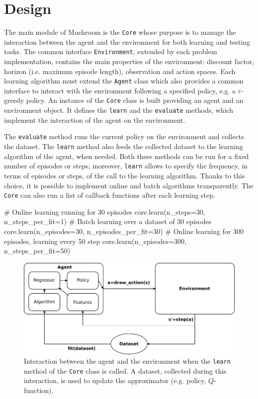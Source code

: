 \section{Design}
The main module of Mushroom is the \texttt{Core} whose purpose is to manage the interaction between the agent and the environment for both learning and testing tasks.
The common interface \texttt{Environment}, extended by each problem implementation, contains the main properties of the environment: discount factor, horizon (i.e. maximum episode length), observation and action spaces.
Each learning algorithm must extend the \texttt{Agent} class which also provides a common interface to interact with the environment following a specified policy, e.g. a $\varepsilon$-greedy policy.
An instance of the \texttt{Core} class is built providing an agent and an environment object. It defines the \texttt{learn} and the \texttt{evaluate} methods, which implement the interaction of the agent on the environment.

The \texttt{evaluate} method runs the current policy on the environment and collects the dataset. The \texttt{learn} method also feeds the collected dataset to the learning algorithm of the agent, when needed. Both these methods can be run for a fixed number of episodes or steps; moreover, \texttt{learn} allows to specify the frequency, in terms of episodes or steps, of the call to the learning algorithm. Thanks to this choice, it is possible to implement online and batch algorithms transparently. The \texttt{Core} can also run a list of callback functions after each learning step.
\begin{python}
# Online learning running for $30$ episodes
core.learn(n_steps=30, n_steps_per_fit=1)
# Batch learning over a dataset of 30 episodes
core.learn(n_episodes=30, n_episodes_per_fit=30)
# Online learning for 300 episodes, learning every 50 step
core.learn(n_episodes=300, n_steps_per_fit=50)
\end{python}
\begin{figure}[t]
\centering
 \includegraphics[width=.8\textwidth]{img/msh.pdf}
 \caption{Interaction between the agent and the environment when the \texttt{learn} method of the \texttt{Core} class is called. A dataset, collected during this interaction, is used to update the approximator (e.g. policy, $Q$-function).}
\end{figure}\label{F:core}

